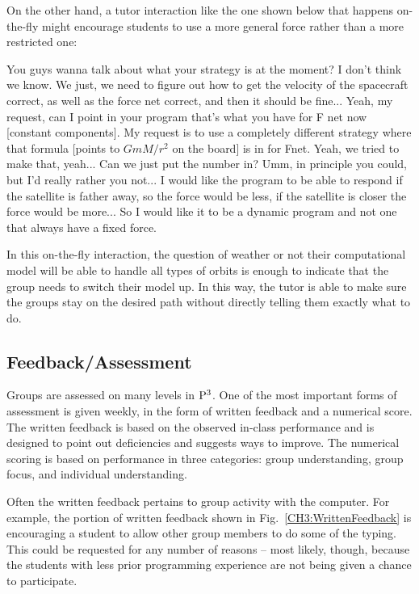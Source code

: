 \documentclass{msuphddissertation}
\begin{document}
\begin{doublespace}
On the other hand, a tutor interaction like the one shown below that happens on-the-fly might encourage students to use a more general force rather than a more restricted one:  \begin{description}\TA You guys wanna talk about what your strategy is at the moment?
\SB I don't think we know.
\SA We just, we need to figure out how to get the velocity of the spacecraft correct, as well as the force net correct, and then it should be fine...		
\TA Yeah, my request, can I point in your program that's what you have for F net now [constant components].
\TA My request is to use a completely different strategy where that formula [points to $G m M/r^{2}$ on the board] is in for Fnet.
\SC Yeah, we tried to make that, yeah...
\SA Can we just put the number in?				
\TA Umm, in principle you could, but I'd really rather you not... I would like the program to be able to respond if the satellite is father away, so the force would be less, if the satellite is closer the force would be more...
\TA So I would like it to be a dynamic program and not one that always have a fixed force.\end{description}  In this on-the-fly interaction, the question of weather or not their computational model will be able to handle all types of orbits is enough to indicate that the group needs to switch their model up.  In this way, the tutor is able to make sure the groups stay on the desired path without directly telling them exactly what to do.

\subsection{Feedback/Assessment}

Groups are assessed on many levels in ${\rm P}^{3}$.  One of the most important forms of assessment is given weekly, in the form of written feedback and a numerical score.  The written feedback is based on the observed in-class performance and is designed to point out deficiencies and suggests ways to improve.  The numerical scoring is based on performance in three categories: group understanding, group focus, and individual understanding.

Often the written feedback pertains to group activity with the computer.  For example, the portion of written feedback shown in Fig.~\ref{CH3:WrittenFeedback} is encouraging a student to allow other group members to do some of the typing.   This could be requested for any number of reasons -- most likely, though, because the students with less prior programming experience are not being given a chance to participate.


\end{doublespace}
\end{document}
